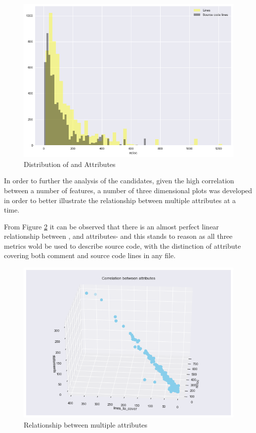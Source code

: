 \begin{figure}
    \centering
    \includegraphics[scale=0.6]{Figures/correlation/Attribute_Distribution_in_Candidate_7.png}
    \caption{Distribution of \ncloc{} and \lines{} Attributes}
    \label{fig:candidate7-distribution}
\end{figure}


In order to further the analysis of the  candidates, given the high correlation between a number of features, a number of three dimensional plots was developed in order to better illustrate the relationship between multiple attributes at a time.

From Figure \ref{fig:3d:ncloc-linesToCover-statements} it can be observed that there is an almost perfect linear relationship between \statements{}, \ncloc{} and \lines{} attributes- and this stands to reason as all three metrics wold be used to describe source code, with the distinction of \lines{} attribute covering both comment and source code lines in any file.
\begin{figure}[!h]
    \centering
    \includegraphics[scale=0.7]{Figures/three-d/Correlation-between-attributes-ncloc-lines_to_cover-statements.png}
    \caption{Relationship between multiple attributes}
    \label{fig:3d:ncloc-linesToCover-statements}
\end{figure}

